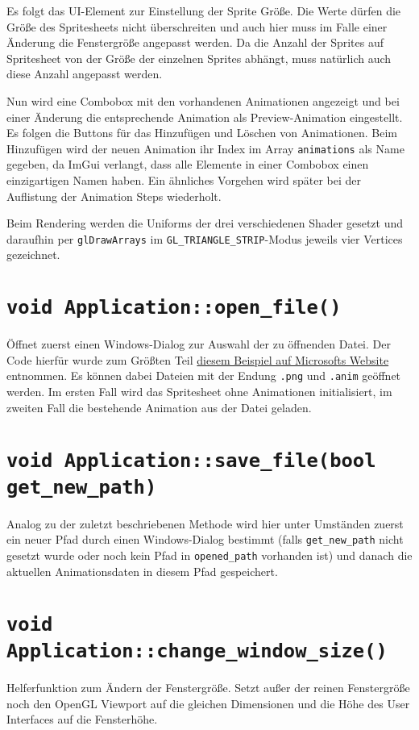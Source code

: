 Es folgt das UI-Element zur Einstellung der Sprite Größe. Die Werte dürfen die Größe des Spritesheets nicht überschreiten und auch hier muss im Falle einer Änderung die Fenstergröße angepasst werden. Da die Anzahl der Sprites auf Spritesheet von der Größe der einzelnen Sprites abhängt, muss natürlich auch diese Anzahl angepasst werden. 

Nun wird eine Combobox mit den vorhandenen Animationen angezeigt und bei einer Änderung die entsprechende Animation als Preview-Animation eingestellt. Es folgen die Buttons für das Hinzufügen und Löschen von Animationen. Beim Hinzufügen wird der neuen Animation ihr Index im Array \lstinline{animations} als Name gegeben, da ImGui verlangt, dass alle Elemente in einer Combobox einen einzigartigen Namen haben. Ein ähnliches Vorgehen wird später bei der Auflistung der Animation Steps wiederholt. 

Beim Rendering werden die Uniforms der drei verschiedenen Shader gesetzt und daraufhin per \lstinline{glDrawArrays} im \lstinline{GL_TRIANGLE_STRIP}-Modus jeweils vier Vertices gezeichnet. 

\section{\lstinline{void Application::open_file()}}
Öffnet zuerst einen Windows-Dialog zur Auswahl der zu öffnenden Datei. Der Code hierfür wurde zum Größten Teil \href{https://docs.microsoft.com/en-us/windows/win32/learnwin32/example--the-open-dialog-box}{diesem Beispiel auf Microsofts Website} entnommen. Es können dabei Dateien mit der Endung \lstinline{.png} und \lstinline{.anim} geöffnet werden. Im ersten Fall wird das Spritesheet ohne Animationen initialisiert, im zweiten Fall die bestehende Animation aus der Datei geladen. 

\section{\lstinline{void Application::save_file(bool get_new_path)}}
Analog zu der zuletzt beschriebenen Methode wird hier unter Umständen zuerst ein neuer Pfad durch einen Windows-Dialog bestimmt (falls \lstinline{get_new_path} nicht gesetzt wurde oder noch kein Pfad in \lstinline{opened_path} vorhanden ist) und danach die aktuellen Animationsdaten in diesem Pfad gespeichert.

\section{\lstinline{void Application::change_window_size()}}
Helferfunktion zum Ändern der Fenstergröße. Setzt außer der reinen Fenstergröße noch den OpenGL Viewport auf die gleichen Dimensionen und die Höhe des User Interfaces auf die Fensterhöhe.



